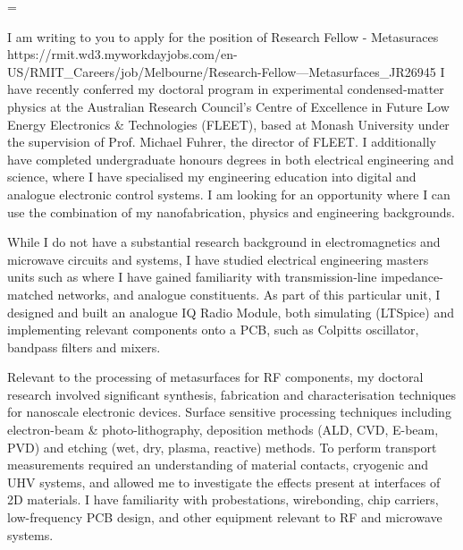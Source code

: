 \documentclass[10pt,a4paper,ragged2e,withhyper,paragraphstrue]{altacv}
\newcommand{\textalignment}{
    \tolerance=1 %
    \emergencystretch=\maxdimen
    \hyphenpenalty=10000 
    \hbadness=10000
}
\newcommand{\pind}{\hspace{24pt}}
\begin{document}
    

    \vspace{1em}

    {
    \textalignment
    \pind I am writing to you to apply for the position of Research Fellow - Metasuraces
    {https://rmit.wd3.myworkdayjobs.com/en-US/RMIT_Careers/job/Melbourne/Research-Fellow---Metasurfaces_JR26945}
    I have recently conferred my doctoral program in experimental condensed-matter physics at the Australian Research Council's 
    Centre of Excellence in Future Low Energy Electronics \& Technologies (FLEET), based at Monash University
    under the supervision of Prof. Michael Fuhrer, the director of FLEET. 
    I additionally have completed undergraduate honours degrees in both electrical engineering and science, where I have specialised my 
    engineering education into digital and analogue electronic control systems. I am looking for an opportunity where I can
    use the combination of my nanofabrication, physics and engineering backgrounds.

    \pind While I do not have a substantial research background in electromagnetics and microwave circuits and systems, I have studied 
    electrical engineering masters units such as 
    where I have gained familiarity with transmission-line impedance-matched networks, and analogue constituents.
    As part of this particular unit, I designed and built an analogue IQ Radio Module, both simulating (LTSpice) and 
    implementing relevant components onto a PCB, such as Colpitts oscillator, bandpass filters and mixers.

    \pind Relevant to the processing of metasurfaces for RF components, my doctoral research involved significant synthesis, fabrication
    and characterisation techniques for nanoscale electronic devices. Surface sensitive processing techniques including electron-beam 
    \& photo-lithography, deposition methods (ALD, CVD, E-beam, PVD) and etching (wet, dry, plasma, reactive) methods.
    To perform transport measurements required an understanding of material contacts, cryogenic and UHV systems, and allowed me to 
    investigate the effects present at interfaces of 2D materials. I have familiarity with probestations, wirebonding, chip carriers, 
    low-frequency PCB design, and other equipment relevant to RF and microwave systems.
    
}
\end{document}
